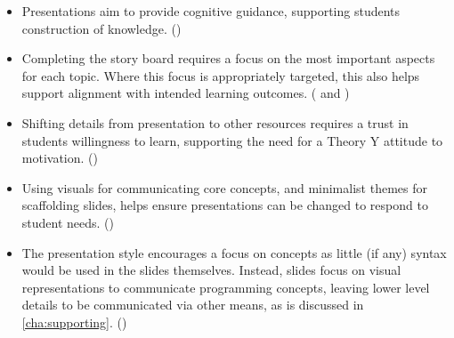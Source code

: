 \begin{itemize}[noitemsep,nolistsep]
	\item Presentations aim to provide cognitive guidance, supporting students construction of knowledge. ()
 	\item Completing the story board requires a focus on the most important aspects for each topic. Where this focus is appropriately targeted, this also helps support alignment with intended learning outcomes. ( and )
 	\item Shifting details from presentation to other resources requires a trust in students willingness to learn, supporting the need for a Theory Y attitude to motivation. ()
 	\item Using visuals for communicating core concepts, and minimalist themes for scaffolding slides, helps ensure presentations can be changed to respond to student needs. ()
 	\item The presentation style encourages a focus on concepts as little (if any) syntax would be used in the slides themselves. Instead, slides focus on visual representations to communicate programming concepts, leaving lower level details to be communicated via other means, as is discussed in \cref{cha:supporting}. ()
 \end{itemize} 

